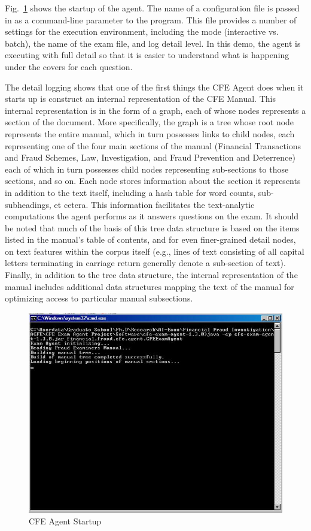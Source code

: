 Fig.~\ref{fig:cfe_agent_startup} shows the startup of the agent.  The name of a configuration file is passed in as a command-line parameter to the program.  This file provides a number of settings for the execution environment, including the mode (interactive vs. batch), the name of the exam file, and log detail level.  In this demo, the agent is executing with full detail so that it is easier to understand what is happening under the covers for each question.

The detail logging shows that one of the first things the CFE Agent does when it starts up is construct an internal representation of the CFE Manual.  This internal representation is in the form of a graph, each of whose nodes represents a section of the document.  More specifically, the graph is a tree whose root node represents the entire manual, which in turn possesses links to child nodes, each representing one of the four main sections of the manual (Financial Transactions and Fraud Schemes, Law, Investigation, and Fraud Prevention and Deterrence) each of which in turn possesses child nodes representing sub-sections to those sections, and so on.  Each node stores information about the section it represents in addition to the text itself, including a hash table for word counts, sub-subheadings, et cetera.  This information facilitates the text-analytic computations the agent performs as it answers questions on the exam.  It should be noted that much of the basis of this tree data structure is based on the items listed in the manual's table of contents, and for even finer-grained detail nodes, on text features within the corpus itself (e.g., lines of text consisting of all capital letters terminating in carriage return generally denote a sub-section of text).  Finally, in addition to the tree data structure, the internal representation of the manual includes additional data structures mapping the text of the manual for optimizing access to particular manual subsections.

\begin{figure}
\centering
\includegraphics[scale=0.75]{screen_shot_1.jpg}
\caption{CFE Agent Startup}
\label{fig:cfe_agent_startup}
\end{figure}


